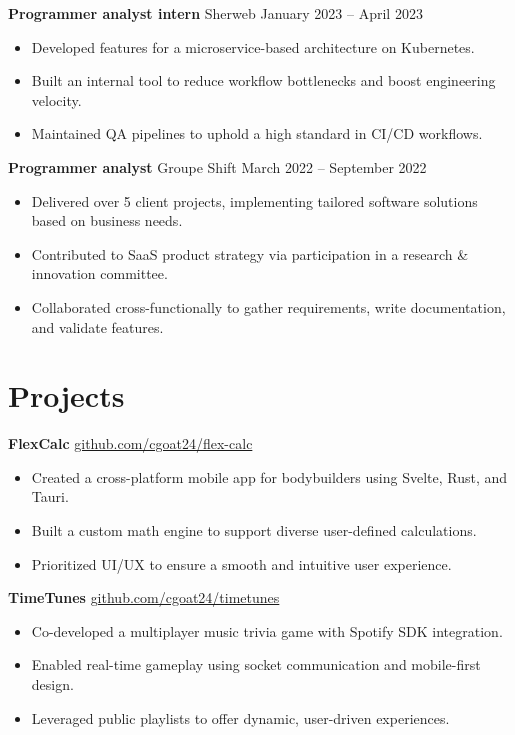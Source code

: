 \documentclass[11pt]{article}       %
\begin{document}
\textbf{Programmer analyst intern} {Sherweb} \hfill January 2023 -- April 2023 \\
\vspace{-9pt}
\begin{itemize}
  \item Developed features for a microservice-based architecture on Kubernetes.
  \item Built an internal tool to reduce workflow bottlenecks and boost engineering velocity.
  \item Maintained QA pipelines to uphold a high standard in CI/CD workflows.
\end{itemize}

\textbf{Programmer analyst} {Groupe Shift} \hfill March 2022 -- September 2022 \\
\vspace{-9pt}
\begin{itemize}
  \item Delivered over 5 client projects, implementing tailored software solutions based on business needs.
  \item Contributed to SaaS product strategy via participation in a research \& innovation committee.
  \item Collaborated cross-functionally to gather requirements, write documentation, and validate features.
\end{itemize}

\vspace{-18.5pt}

\section*{Projects}
\textbf{FlexCalc} \hfill \href{https://github.com/cgoat24/flex-calc}{github.com/cgoat24/flex-calc} \\
\vspace{-9pt}
\begin{itemize}
  \item Created a cross-platform mobile app for bodybuilders using Svelte, Rust, and Tauri.
  \item Built a custom math engine to support diverse user-defined calculations.
  \item Prioritized UI/UX to ensure a smooth and intuitive user experience.
\end{itemize}

\textbf{TimeTunes} \hfill \href{https://github.com/cgoat24/timetunes}{github.com/cgoat24/timetunes} \\
\vspace{-9pt}
\begin{itemize}
  \item Co-developed a multiplayer music trivia game with Spotify SDK integration.
  \item Enabled real-time gameplay using socket communication and mobile-first design.
  \item Leveraged public playlists to offer dynamic, user-driven experiences.
\end{itemize}
\end{document}
